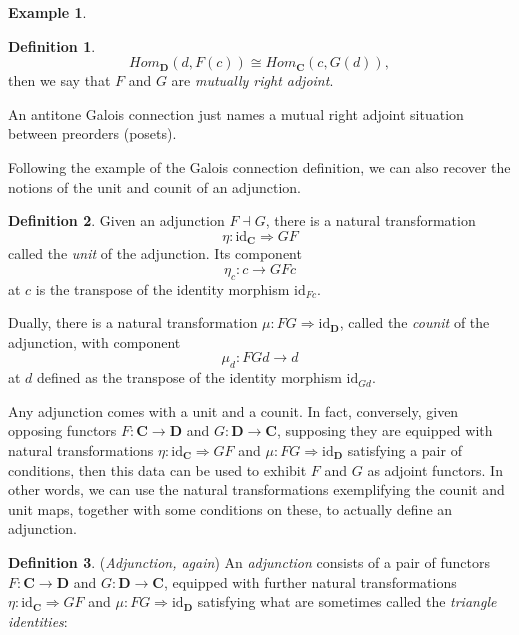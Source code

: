 \documentclass[11pt]{book}
\theoremstyle{definition}
\newtheorem{example}{Example}[section]
\theoremstyle{definition}
\newtheorem{definition}{Definition}[section]
\theoremstyle{definition}
\theoremstyle{theorem}
\theoremstyle{definition}
\begin{document}
\begin{example}
\begin{definition}
\begin{equation}
	Hom_{\textbf{D}}(d, F(c)) \cong Hom_{\textbf{C}}(c, G(d)),
	\end{equation}
	then we say that $F$ and $G$ are \textit{mutually right adjoint}.
\end{definition} \noindent 
An antitone Galois connection just names a mutual right adjoint situation between preorders (posets). \par 
	Following the example of the Galois connection definition, we can also recover the notions of the unit and counit of an adjunction.
	\begin{definition}
		Given an adjunction $F \dashv G$, there is a natural transformation 
		\begin{equation*}
		\eta: \text{id}_{\textbf{C}} \Rightarrow GF
		\end{equation*} 
		called the \textit{unit} of the adjunction. Its component 
		\begin{equation*}
		\eta_c: c \rightarrow GFc
		\end{equation*}
		at $c$ is the transpose of the identity morphism $\text{id}_{Fc}$. \par 
		Dually, there is a natural transformation $\mu: FG \Rightarrow \text{id}_{\textbf{D}}$, called the \textit{counit} of the adjunction,  with component 
		\begin{equation*}
		\mu_d: FGd \rightarrow d
		\end{equation*}
		at $d$ defined as the transpose of the identity morphism $\text{id}_{Gd}$. 
	\end{definition}
Any adjunction comes with a unit and a counit. In fact, conversely, given opposing functors $F: \textbf{C} \rightarrow \textbf{D}$ and $G: \textbf{D} \rightarrow \textbf{C}$, supposing they are equipped with natural transformations $\eta: \text{id}_{\textbf{C}} \Rightarrow GF$ and $\mu: FG \Rightarrow \text{id}_{\textbf{D}}$ satisfying a pair of conditions, then this data can be used to exhibit $F$ and $G$ as adjoint functors. In other words, we can use the natural transformations exemplifying the counit and unit maps, together with some conditions on these, to actually define an adjunction. 
\begin{definition}
	(\textit{Adjunction, again})  An \textit{adjunction} consists of a pair of functors $F: \textbf{C} \rightarrow \textbf{D}$ and $G: \textbf{D} \rightarrow \textbf{C}$, equipped with further natural transformations $\eta: \text{id}_{\textbf{C}} \Rightarrow GF$ and $\mu: FG \Rightarrow \text{id}_{\textbf{D}}$ satisfying what are sometimes called the \textit{triangle identities}:

\end{definition}
\end{example}
\end{document}
